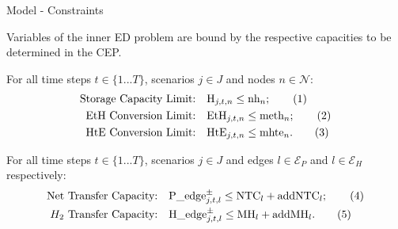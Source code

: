 \begin{frame}{Model - Constraints}

  Variables of the inner ED problem are bound by the respective capacities to be determined in the CEP.
  
  For all time steps $t\in\{1...T\}$, scenarios $j\in J$ and nodes $n\in\mathcal{N}$:
\begin{align*}
    \text{Storage Capacity Limit:} \quad & \text{H}_{j,t,n} \leq \text{nh}_n ;\stepcounter{equation}\tag{\theequation}\label{constr_nh}\\
    \text{EtH Conversion Limit:} \quad & \text{EtH}_{j,t,n} \leq \text{meth}_n; \stepcounter{equation}\tag{\theequation}\label{constr_meth}\\
    \text{HtE Conversion Limit:} \quad & \text{HtE}_{j,t,n} \leq \text{mhte}_n .\stepcounter{equation}\tag{\theequation}\label{constr_mhte}
\end{align*}

For all time steps $t\in\{1...T\}$, scenarios $j\in J$ and edges $l\in \mathcal{E}_P$ and $l\in \mathcal{E}_H$ respectively: 
  \begin{align*}
    \text{Net Transfer Capacity:} \quad & \text{P\_edge}^\pm_{j,t,l}\le\text{NTC}_l + \text{addNTC}_l ;\stepcounter{equation}\tag{\theequation}\label{constr_NTC}\\
    \text{$H_2$ Transfer Capacity:} \quad & \text{H\_edge}^\pm_{j,t,l}\le\text{MH}_l + \text{addMH}_l.\stepcounter{equation}\tag{\theequation}\label{constr_MH}
\end{align*}
\end{frame}
  

